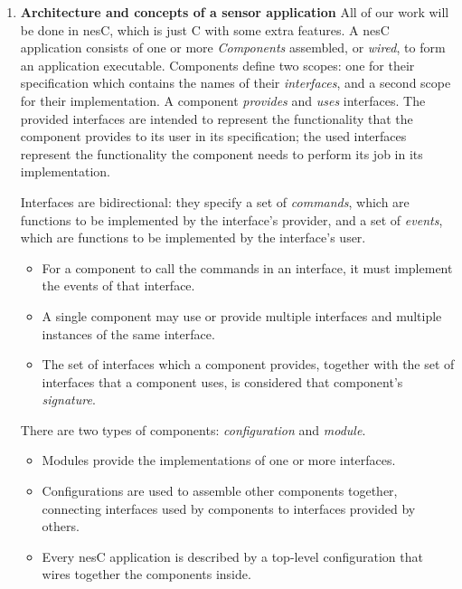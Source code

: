 \documentclass[letterpaper,12pt]{article}
\begin{document}
\begin{enumerate}
\item \textbf{Architecture and concepts of a sensor application}
    All of our work will be done in nesC, which is just C with some extra features.
    A nesC application consists of one or more \emph{Components} assembled, or \emph{wired},
    to form an application executable. Components define two scopes: one for
    their specification which contains the names of their \emph{interfaces},
    and a second scope for their implementation. A component \emph{provides} and \emph{uses}
    interfaces. The provided interfaces are intended to represent the
    functionality that the component provides to its user in its specification;
    the used interfaces represent the functionality the component needs to
    perform its job in its implementation.

    Interfaces are bidirectional: they specify a set of \emph{commands}, which
    are functions to be implemented by the interface's provider, and a set of
    \emph{events}, which are functions to be implemented by the interface's user.
    \begin{itemize}
        \item For a component to call the commands in an interface, it must
              implement the events of that interface.
        \item A single component may use or provide multiple interfaces and
              multiple instances of the same interface.
        \item The set of interfaces which a component provides,
              together with the set of interfaces that a component uses,
              is considered that component's \emph{signature}. 
    \end{itemize}

    There are two types of components: \emph{configuration} and \emph{module}.
    \begin{itemize}
        \item Modules provide the implementations of one or more interfaces.
        \item Configurations are used to assemble other components together,
              connecting interfaces used by components to interfaces provided
              by others.
        \item Every nesC application is described by a top-level configuration
              that wires together the components inside. 
    \end{itemize}


\end{enumerate}
\end{document}
